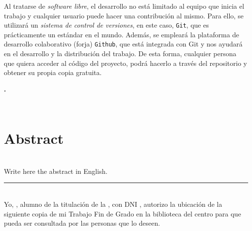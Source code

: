 Al tratarse de \textit{software libre}, el desarrollo no está limitado al equipo que inicia el trabajo y cualquier usuario puede hacer una contribución al mismo. Para ello, se utilizará un \textit{sistema de control de versiones}, en este caso, {\tt Git}, que es prácticamente un estándar en el mundo. Además, se empleará la plataforma de desarrollo colaborativo (forja) {\tt Github}, que está integrada con Git y nos ayudará en el desarrollo y la distribución del trabajo. De esta forma, cualquier persona que quiera acceder al código del proyecto, podrá hacerlo a través del repositorio y obtener su propia copia gratuita.




\newpage

\begin{center}
{\large\bfseries \myTitle. \mySubTitleENG}\\
\end{center}
\begin{center}
\myName\\
\end{center}

\section*{Abstract}

\bigskip
{}\\

Write here the abstract in English.

\newpage

\thispagestyle{empty}
\noindent\rule[-1ex]{\textwidth}{2pt}\\[4.5ex]

Yo, \textbf{\myName}, alumno de la titulación \myDegree{} de la \textbf{\myFaculty}, con DNI \myDNI, autorizo la
ubicación de la siguiente copia de mi Trabajo Fin de Grado en la biblioteca del centro para que pueda ser
consultada por las personas que lo deseen.

